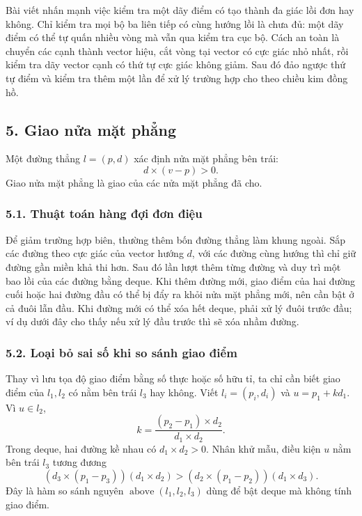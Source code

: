 \documentclass[11pt]{article}
\begin{document}
Bài viết nhấn mạnh việc kiểm tra một dãy điểm có tạo thành đa giác lồi đơn hay
không. Chỉ kiểm tra mọi bộ ba liên tiếp có cùng hướng lồi là chưa đủ: một dãy
điểm có thể tự quấn nhiều vòng mà vẫn qua kiểm tra cục bộ. Cách an toàn là
chuyển các cạnh thành vector hiệu, cắt vòng tại vector có cực giác nhỏ nhất,
rồi kiểm tra dãy vector cạnh có thứ tự cực giác không giảm. Sau đó đảo ngược
thứ tự điểm và kiểm tra thêm một lần để xử lý trường hợp cho theo chiều kim
đồng hồ.

\subsection*{5. Giao nửa mặt phẳng}

Một đường thẳng \(l=(p,d)\) xác định nửa mặt phẳng bên trái:
\[
  d\times(v-p)>0.
\]
Giao nửa mặt phẳng là giao của các nửa mặt phẳng đã cho.

\subsubsection*{5.1. Thuật toán hàng đợi đơn điệu}

Để giảm trường hợp biên, thường thêm bốn đường thẳng làm khung ngoài. Sắp các
đường theo cực giác của vector hướng \(d\), với các đường cùng hướng thì chỉ
giữ đường gần miền khả thi hơn. Sau đó lần lượt thêm từng đường và duy trì một
bao lồi của các đường bằng deque. Khi thêm đường mới, giao điểm của hai đường
cuối hoặc hai đường đầu có thể bị đẩy ra khỏi nửa mặt phẳng mới, nên cần bật ở
cả đuôi lẫn đầu. Khi đường mới có thể xóa hết deque, phải xử lý đuôi trước
đầu; ví dụ dưới đây cho thấy nếu xử lý đầu trước thì sẽ xóa nhầm đường.


\subsubsection*{5.2. Loại bỏ sai số khi so sánh giao điểm}

Thay vì lưu tọa độ giao điểm bằng số thực hoặc số hữu tỉ, ta chỉ cần biết giao
điểm của \(l_1,l_2\) có nằm bên trái \(l_3\) hay không. Viết \(l_i=(p_i,d_i)\)
và \(u=p_1+kd_1\). Vì \(u\in l_2\),
\[
  k=\frac{(p_2-p_1)\times d_2}{d_1\times d_2}.
\]
Trong deque, hai đường kề nhau có \(d_1\times d_2>0\). Nhân khử mẫu, điều kiện
\(u\) nằm bên trái \(l_3\) tương đương
\[
  (d_3\times(p_1-p_3))(d_1\times d_2)
  >
  (d_2\times(p_1-p_2))(d_1\times d_3).
\]
Đây là hàm so sánh nguyên \(\operatorname{above}(l_1,l_2,l_3)\) dùng để bật
deque mà không tính giao điểm.
\end{document}
